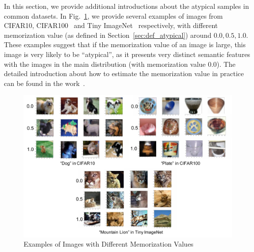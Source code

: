 In this section, we provide additional introductions about the atypical samples in common datasets.
In Fig.~\ref{fig:show_mem}, we provide several examples of images from CIFAR10, CIFAR100~\cite{krizhevsky2009learning} and Tiny ImageNet~\cite{le2015tiny} respectively, with different memorization value (as defined in Section~\ref{sec:def_atypical}) around $0.0, 0.5, 1.0$. These examples suggest that if the memorization value of an image is large, this image is very likely to be ``atypical'', as it presents very distinct semantic features with the images in the main distribution (with memorization value 0.0). The detailed introduction about how to estimate the memorization value in practice can be found in the  work~\cite{feldman2020neural}.
\begin{figure}[h]
    \centering
    \includegraphics[width = 0.9\linewidth]{figures/atypical_examples.pdf}
    \caption{Examples of Images with Different Memorization Values}
    \label{fig:show_mem}
\end{figure}

